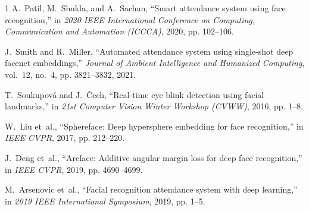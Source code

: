 \documentclass[journal,10pt,twocolumn]{IEEEtran}
\begin{document}

\begin{thebibliography}{1}
A.~Patil, M.~Shukla, and A.~Sachan, ``Smart attendance system using face recognition,'' in \emph{2020 IEEE International Conference on Computing, Communication and Automation (ICCCA)}, 2020, pp. 102--106.

J.~Smith and R.~Miller, ``Automated attendance system using single-shot deep facenet embeddings,'' \emph{Journal of Ambient Intelligence and Humanized Computing}, vol.~12, no.~4, pp. 3821--3832, 2021.

T.~Soukupov\'{a} and J.~\v{C}ech, ``Real-time eye blink detection using facial landmarks,'' in \emph{21st Computer Vision Winter Workshop (CVWW)}, 2016, pp. 1--8.

W.~Liu et~al., ``Sphereface: Deep hypersphere embedding for face recognition,'' in \emph{IEEE CVPR}, 2017, pp. 212--220.

J.~Deng et~al., ``Arcface: Additive angular margin loss for deep face recognition,'' in \emph{IEEE CVPR}, 2019, pp. 4690--4699.

M.~Arsenovic et~al., ``Facial recognition attendance system with deep learning,'' in \emph{2019 IEEE International Symposium}, 2019, pp. 1--5.
\end{thebibliography}
\end{document}
